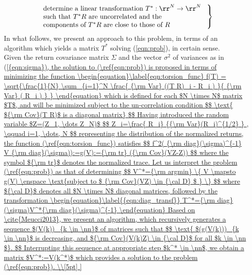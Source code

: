 \begin{equation} \left.
\begin{array}{l}\label{eqn:prob}
\text{determine a linear transformation $T^*: \rr^N \to \rr^N$ } \\
\text{such that $T^* R$ are uncorrelated and the} \\
\text{components of     $T^*R$ are close to those of  $R$  }
\end{array} \right\} 
\end{equation} 
In what follows, we present an approach to this problem, in terms of an 
algorithm which yields  a matrix $T^*$  solving (\ref{eqn:prob}), in certain sense. 
\\[5pt]
Given the return covariance matrix  $\Sigma$ and the vector $\sigma^2$  of variances as in (\ref{{eqn:sigma}), 
 the solution to (\ref{eqn:prob}) is proposed
in terms of minimizing the function
\begin{equation}\label{eqn:torsion_func}
f(T) = \sqrt{\frac{1}{N} \sum_{i=1}^N 
	\frac{
		{\rm Var} ((T R)_i - R_i )
		}{
			{\rm Var} ( R_i )
		} }
\end{equation}
which is defined for each  $N \times N$ matrix $T$, and will be minimized 
 subject to the un-correlation condition
$$
\text{ ${\rm Cov}(T R)$ is a diagonal matrix}
$$
Having introduced the random variable  $Z=(Z_1, \dots Z_N)$
$$
Z_i=\frac{ R_i} 
   {{\rm Var}(R_i)^{1/2}
   		} , \qquad i=1, \dots, N
$$
representing the distribution of the normalized returns, the function (\ref{eqn:torsion_func}) satisfies
$$
f^2( {\rm diag}(\sigma)^{-1} V  {\rm diag}(\sigma)):=g(V):={\rm tr}  ({\rm Cov}(VZ-Z))
$$
where the symbol ${\rm tr}$ denotes the normalized trace. Let us interpret 
the problem (\ref{eqn:prob}) as that of   determining 
$$
V^*={\rm argmin} \{ V \mapsto g(V) \enspace \text{subject to  $ {\rm Cov}(VZ)
	\in {\cal D} $ } \}
$$ 
where  ${\cal D}$ denotes all $N \times N$ diagonal matrices, followed by the transformation
\begin{equation}\label{{eqn:diag_transf}}
T^*={\rm diag}(\sigma)V^*{\rm diag}(\sigma)^{-1} 
\end{equation}
Based on  \cite{Meucci2013},
we  present an algorithm,
which recursively  generates a sequence $(V(k))_{k \in \nn}$ of matrices  such that
$$
\text{ $(g(V(k)))_{k \in \nn}$  is decreasing, and	${\rm Cov}(V(k)Z)
\in {\cal D}$ for all $k \in \nn $}.
$$ 
Interrupting this sequence at appropriate step $k^* \in \nn$, we obtain 
a matrix $V^*:=V(k^*)$ which provides a solution to the problem (\ref{eqn:prob}).
\\[5pt]
}
